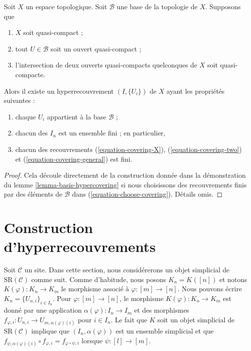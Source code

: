 \begin{lemma}
\label{lemma-quasi-separated-quasi-compact-hypercovering}
Soit $X$ un espace topologique.
Soit $\mathcal{B}$ une base de la topologie de $X$.
Supposons que
\begin{enumerate}
\item $X$ soit quasi-compact ;
\item tout $U \in \mathcal{B}$ soit un ouvert quasi-compact ;
\item l'intersection de deux ouverts quasi-compacts quelconques de
$X$ soit quasi-compacte.
\end{enumerate}
Alors il existe un hyperrecouvrement $(I, \{U_i\})$ de $X$ ayant les
propriétés suivantes :
\begin{enumerate}
\item chaque $U_i$ appartient à la base $\mathcal{B}$ ;
\item chacun des $I_n$ est un ensemble fini ; en particulier,
\item chacun des recouvrements (\ref{equation-covering-X}),
(\ref{equation-covering-two}) et (\ref{equation-covering-general})
est fini.
\end{enumerate}
\end{lemma}

\begin{proof}
Cela découle directement de la construction donnée dans la démonstration du
lemme \ref{lemma-basis-hypercovering} si nous choisissons des recouvrements finis
par des éléments de $\mathcal{B}$ dans (\ref{equation-choose-covering}).
Détails omis.
\end{proof}







\section{Construction d'hyperrecouvrements}
\label{section-hypercovering-sites}

\noindent
Soit $\mathcal{C}$ un site. Dans cette section, nous considérerons un
objet simplicial de $\text{SR}(\mathcal{C})$ comme suit.
Comme d'habitude, nous posons $K_n = K([n])$ et notons $K(\varphi) : K_n \to K_m$
le morphisme associé à $\varphi : [m] \to [n]$.
Nous pouvons écrire $K_n = \{U_{n, i}\}_{i \in I_n}$. Pour
$\varphi : [m] \to [n]$, le morphisme $K(\varphi) : K_n \to K_m$
est donné par une application $\alpha(\varphi) : I_n \to I_m$ et des morphismes
$f_{\varphi, i} : U_{n, i} \to U_{m, \alpha(\varphi)(i)}$
pour $i \in I_n$. Le fait que $K$ soit un objet simplicial de
$\text{SR}(\mathcal{C})$ implique que $(I_n, \alpha(\varphi))$
est un ensemble simplicial
et que $f_{\psi, \alpha(\varphi)(i)} \circ f_{\varphi, i} =
f_{\varphi \circ \psi, i}$ lorsque $\psi : [l] \to [m]$.

